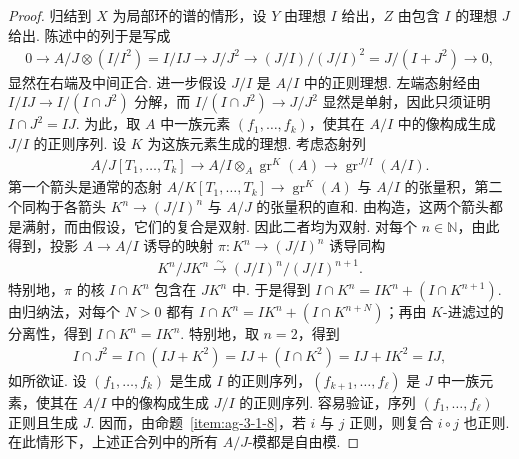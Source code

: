 \begin{proof}
归结到 $X$ 为局部环的谱的情形，设 $Y$ 由理想 $I$ 给出，$Z$ 由包含 $I$ 的理想 $J$ 给出. 陈述中的列于是写成
\begin{align*}
0\longrightarrow A/J\otimes(I/I^2)=I/IJ\longrightarrow J/J^2\longrightarrow(J/I)/(J/I)^2=J/(I+J^2)\longrightarrow0,
\end{align*}
显然在右端及中间正合. 进一步假设 $J/I$ 是 $A/I$ 中的正则理想. 左端态射经由 $I/IJ\longrightarrow I/(I\cap J^2)$ 分解，而 $I/(I\cap J^2)\longrightarrow J/J^2$ 显然是单射，因此只须证明 $I\cap J^2=IJ$. 为此，取 $A$ 中一族元素 $(f_1,\ldots,f_k)$，使其在 $A/I$ 中的像构成生成 $J/I$ 的正则序列. 设 $K$ 为这族元素生成的理想. 考虑态射列
\begin{align*}
A/J[T_1,\ldots,T_k]\longrightarrow A/I\otimes_A\operatorname{gr}^{K}(A)\longrightarrow\operatorname{gr}^{J/I}(A/I).
\end{align*}
第一个箭头是通常的态射 $A/K[T_1,\ldots,T_k]\longrightarrow\operatorname{gr}^{K}(A)$ 与 $A/I$ 的张量积，第二个同构于各箭头 $K^n\longrightarrow(J/I)^n$ 与 $A/J$ 的张量积的直和. 由构造，这两个箭头都是满射，而由假设，它们的复合是双射. 因此二者均为双射. 对每个 $n\in\mathbb N$，由此得到，投影 $A\longrightarrow A/I$ 诱导的映射 $\pi:K^n\longrightarrow(J/I)^n$ 诱导同构
\begin{align*}
K^n/JK^n\xrightarrow\sim(J/I)^n/(J/I)^{n+1}.
\end{align*}
特别地，$\pi$ 的核 $I\cap K^n$ 包含在 $JK^n$ 中. 于是得到 $I\cap K^n=IK^n+(I\cap K^{n+1})$. 由归纳法，对每个 $N>0$ 都有 $I\cap K^n=IK^n+(I\cap K^{n+N})$；再由 $K$-进滤过的分离性，得到 $I\cap K^n=IK^n$. 特别地，取 $n=2$，得到
\begin{align*}
I\cap J^2=I\cap(IJ+K^2)=IJ+(I\cap K^2)=IJ+IK^2=IJ,
\end{align*}
如所欲证.
设 $(f_1,\ldots,f_k)$ 是生成 $I$ 的正则序列，$(f_{k+1},\ldots,f_\ell)$ 是 $J$ 中一族元素，使其在 $A/I$ 中的像构成生成 $J/I$ 的正则序列. 容易验证，序列 $(f_1,\ldots,f_\ell)$ 正则且生成 $J$. 因而，由命题~\ref{item:ag-3-1-8}，若 $i$ 与 $j$ 正则，则复合 $i\circ j$ 也正则. 在此情形下，上述正合列中的所有 $A/J$-模都是自由模.
\end{proof}